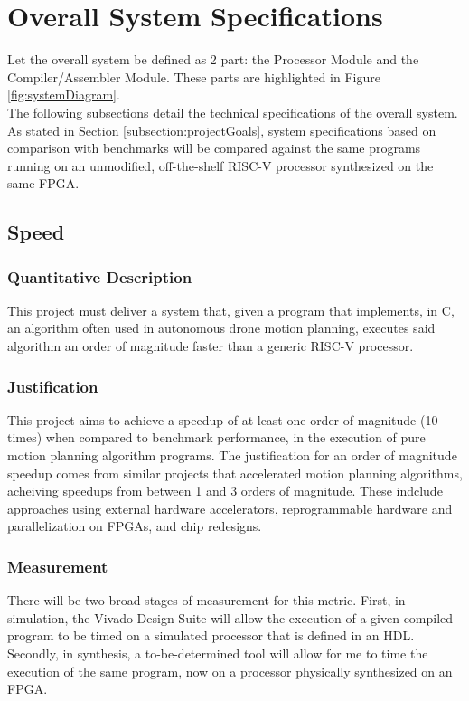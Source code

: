 \documentclass[11pt, oneside]{article}      %
\begin{document}
\clearpage

\section{Overall System Specifications}
Let the overall system be defined as 2 part: the Processor Module and the Compiler/Assembler Module. These parts are highlighted in Figure \ref{fig:systemDiagram}. \\
The following subsections detail the technical specifications of the overall system. As stated in Section \ref{subsection:projectGoals}, system specifications based on comparison with benchmarks will be compared against the same programs running on an unmodified, off-the-shelf RISC-V processor synthesized on the same \ac{FPGA}.
\subsection{Speed}
\subsubsection{Quantitative Description}
This project must deliver a system that, given a program that implements, in C, an algorithm often used in autonomous drone motion planning, executes said algorithm an order of magnitude faster than a generic RISC-V processor.

\subsubsection{Justification}
This project aims to achieve a speedup of at least one order of magnitude (10 times) when compared to benchmark performance, in the execution of pure motion planning algorithm programs.
The justification for an order of magnitude speedup comes from similar projects that accelerated motion planning algorithms, acheiving speedups from between 1 and 3 orders of magnitude. These indclude approaches using external hardware accelerators\cite{Murraya}, reprogrammable hardware and parallelization on FPGAs\cite{Murray}\cite{Atay2006}\cite{Malik2015}, and chip redesigns\cite{Murrayb}\cite{Zhi}.

\subsubsection{Measurement}
There will be two broad stages of measurement for this metric. First, in simulation, the Vivado Design Suite\cite{Vivado} will allow the execution of a given compiled program to be timed on a simulated processor that is defined in an \ac{HDL}. Secondly, in synthesis, a to-be-determined tool will allow for me to time the execution of the same program, now on a processor physically synthesized on an FPGA. 
\end{document}
